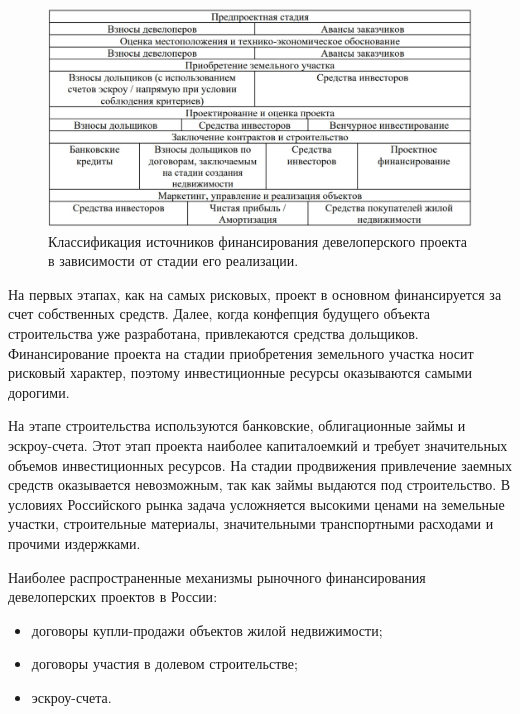 \documentclass[12pt,a4paper]{article} %
\begin{document}
\begin{figure}[h]
	
	\centering
	
	\includegraphics[width=0.7\linewidth]{fin_source_clas.jpg}
	
	\caption{Классификация источников финансирования девелоперского проекта в зависимости от стадии его реализации.}
	
	\label{fig:fin_source_clas}
	
\end{figure}

На первых этапах, как на самых рисковых, проект в основном финансируется за счет собственных средств. Далее, когда конфепция будущего объекта строительства уже разработана, привлекаются средства дольщиков. Финансирование проекта на стадии приобретения земельного участка носит рисковый характер, поэтому инвестиционные ресурсы оказываются самыми дорогими.

На этапе строительства используются банковские, облигационные займы и эскроу-счета. Этот этап проекта наиболее капиталоемкий  и требует значительных объемов инвестиционных ресурсов. На стадии продвижения привлечение заемных средств оказывается невозможным, так как займы выдаются под строительство.
В условиях Российского рынка задача усложняется высокими ценами на земельные участки, строительные материалы, значительными транспортными расходами и прочими издержками.

Наиболее распространенные механизмы рыночного финансирования девелоперских проектов в России\cite{Minstr}:
\begin{itemize}
	\item договоры купли-продажи объектов жилой недвижимости;
	\item договоры участия в долевом строительстве;
	\item эскроу-счета.
\end{itemize}
\end{document}
